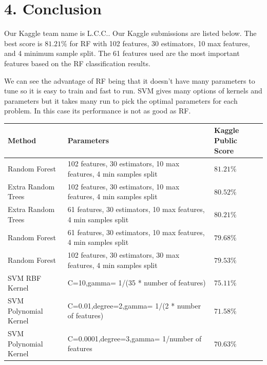\documentclass[submit]{harvardml}
\begin{document}
\section*{4. Conclusion}
Our Kaggle team name is L.C.C.. Our Kaggle submissions are listed below. The best score is $81.21\%$ for RF with 102 features, 30 estimators, 10 max features, and 4 minimum sample split. The 61 features used are the most important features based on the RF classification results.

We can see the advantage of RF being that it doesn't have many parameters to tune so it is easy to train and fast to run. SVM gives many options of kernels and parameters but it takes many run to pick the optimal parameters for each problem. In this case its performance is not as good as RF.

\begin{center}
  \begin{tabular}{ | l | l | l | }
    \hline
    Method & Parameters & Kaggle Public Score \\ \hline
    Random Forest & 102 features, 30 estimators, 10 max features, 4 min samples split & $81.21\%$ \\ \hline
		Extra Random Trees & 102 features, 30 estimators, 10 max features, 4 min samples split & $80.52\%$ \\ \hline				
		    Extra Random Trees & 61 features, 30 estimators, 10 max features, 4 min samples split & $80.21\%$ \\ \hline
				    Random Forest & 61 features, 30 estimators, 10 max features, 4 min samples split & $79.68\%$ \\ \hline
						    Random Forest & 102 features, 30 estimators, 30 max features, 4 min samples split & $79.53\%$ \\ \hline
SVM RBF Kernel & C=10,gamma= 1/(35 * number of features) & $75.11\%$ \\ \hline
SVM Polynomial Kernel & C=0.01,degree=2,gamma= 1/(2 * number of features) & $71.58\%$ \\ \hline
SVM Polynomial Kernel & C=0.0001,degree=3,gamma= 1/number of features & $70.63\%$ \\ \hline								
  \end{tabular}
\end{center}
\end{document}

